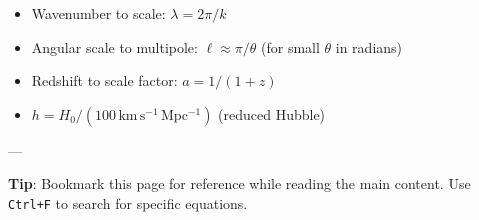 \begin{itemize}
    \item Wavenumber to scale: $\lambda = 2\pi / k$
    \item Angular scale to multipole: $\ell \approx \pi / \theta$ (for small $\theta$ in radians)
    \item Redshift to scale factor: $a = 1 / (1 + z)$
    \item $h = H_0 / (100 \, \mathrm{km \, s^{-1} \, Mpc^{-1}})$ (reduced Hubble)
\end{itemize}

---

\noindent
\textbf{Tip}: Bookmark this page for reference while reading the main content. Use \texttt{Ctrl+F} to search for specific equations.
